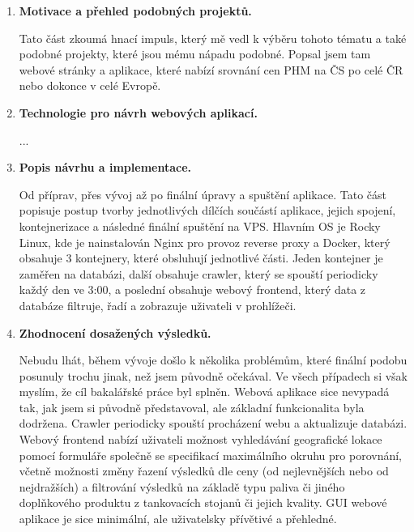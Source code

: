 \begin{enumerate}
    \item \textbf{Motivace a přehled podobných projektů.}
        
        Tato část zkoumá hnací impuls, který mě vedl k výběru tohoto
        tématu a také podobné projekty, které jsou mému nápadu podobné.
        Popsal jsem tam webové stránky a aplikace, které nabízí srovnání
        cen PHM na ČS po celé ČR nebo dokonce v celé Evropě.

    \item \textbf{Technologie pro návrh webových aplikací.}

        ...

    \item \textbf{Popis návrhu a implementace.}

        Od příprav, přes vývoj až po finální úpravy a spuštění aplikace.
        Tato část popisuje postup tvorby jednotlivých dílčích součástí
        aplikace, jejich spojení, kontejnerizace a následné finální
        spuštění na VPS. Hlavním OS je Rocky Linux, kde je nainstalován
        Nginx pro provoz reverse proxy a Docker, který obsahuje 3 kontejnery,
        které obsluhují jednotlivé části. Jeden kontejner je zaměřen
        na databázi, další obsahuje crawler, který se spouští periodicky
        každý den ve 3:00, a poslední obsahuje webový frontend, který data
        z databáze filtruje, řadí a zobrazuje uživateli v prohlížeči.

    \item \textbf{Zhodnocení dosažených výsledků.}

        Nebudu lhát, během vývoje došlo k několika problémům, které
        finální podobu posunuly trochu jinak, než jsem původně očekával.
        Ve všech případech si však myslím, že cíl bakalářské práce byl
        splněn. Webová aplikace sice nevypadá tak, jak jsem si původně
        představoval, ale základní funkcionalita byla dodržena.
        Crawler periodicky spouští procházení webu a aktualizuje databázi.
        Webový frontend nabízí uživateli možnost vyhledávání geografické
        lokace pomocí formuláře společně se specifikací maximálního okruhu
        pro porovnání, včetně možnosti změny řazení výsledků dle ceny
        (od nejlevnějších nebo od nejdražších) a filtrování výsledků
        na základě typu paliva či jiného doplňkového produktu z tankovacích
        stojanů či jejich kvality. GUI webové aplikace je sice minimální,
        ale uživatelsky přívětivé a přehledné.
\end{enumerate}

